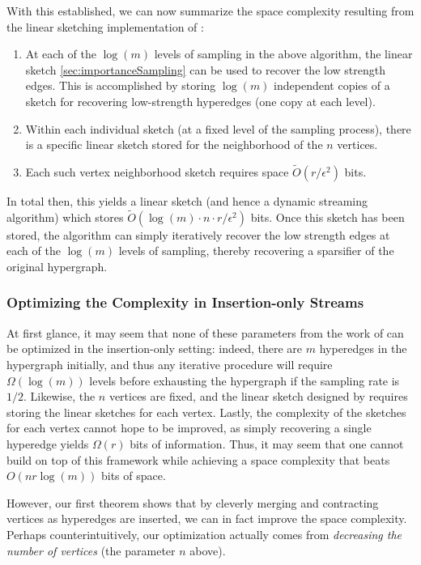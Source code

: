 \documentclass[11pt]{article}
\theoremstyle{definition}
\newcommand{\eps}{\epsilon}
\begin{document}
With this established, we can now summarize the space complexity resulting from the linear sketching implementation of \cite{KPS24d}:
\begin{enumerate}
    \item At each of the $\log(m)$ levels of sampling in the above algorithm, the linear sketch \cref{sec:importanceSampling} can be used to recover the low strength edges. This is accomplished by storing $\log(m)$ independent copies of a sketch for recovering low-strength hyperedges (one copy at each level).
    \item Within each individual sketch (at a fixed level of the sampling process), there is a specific linear sketch stored for the neighborhood of the $n$ vertices. 
    \item Each such vertex neighborhood sketch requires space $\widetilde{O}(r  / \eps^2)$ bits.
\end{enumerate}
In total then, this yields a linear sketch (and hence a dynamic streaming algorithm) which stores $\widetilde{O}(\log(m) \cdot n \cdot r / \eps^2)$ bits. Once this sketch has been stored, the algorithm can simply iteratively recover the low strength edges at each of the $\log(m)$ levels of sampling, thereby recovering a sparsifier of the original hypergraph. 

\subsubsection{Optimizing the Complexity in Insertion-only Streams}

At first glance, it may seem that none of these parameters from the work of \cite{KPS24d} can be optimized in the insertion-only setting: indeed, there are $m$ hyperedges in the hypergraph initially, and thus any iterative procedure will require $\Omega(\log(m))$ levels before exhausting the hypergraph if the sampling rate is $1/2$. Likewise, the $n$ vertices are fixed, and the linear sketch designed by \cite{KPS24d} requires storing the linear sketches for each vertex. Lastly, the complexity of the sketches for each vertex cannot hope to be improved, as simply recovering a single hyperedge yields $\Omega(r)$ bits of information. Thus, it may seem that one cannot build on top of this framework while achieving a space complexity that beats $O(n r \log(m))$ bits of space.

However, our first theorem shows that by cleverly merging and contracting vertices as hyperedges are inserted, we can in fact improve the space complexity. Perhaps counterintuitively, our optimization actually comes from \emph{decreasing the number of vertices} (the parameter $n$ above). 
\end{document}
